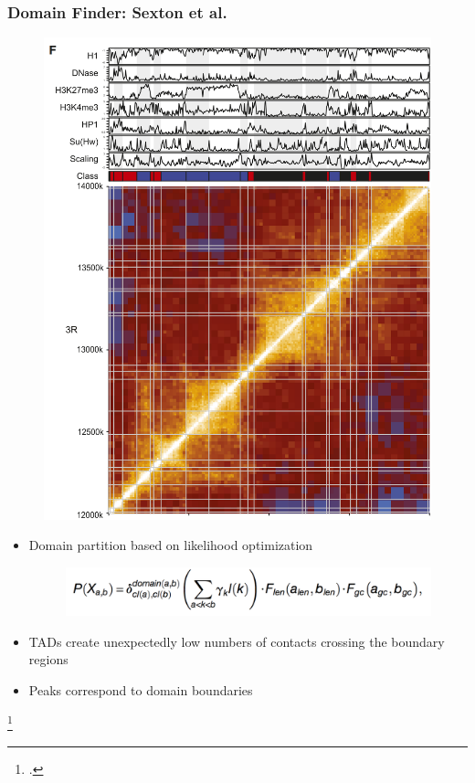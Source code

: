 \documentclass[12pt]{beamer}
\begin{document}
\begin{frame}
\frametitle{Domain Finder: Sexton et al.}

\begin{figure}
\includegraphics[scale=0.27]{dixon.png}
\end{figure}

\begin{itemize}
\item Domain partition based on likelihood optimization
\begin{figure}
\includegraphics[scale=0.8]{dixoneq.png}
\end{figure}
\vspace{0.1cm}
\item TADs create unexpectedly low numbers of contacts crossing the
  boundary regions
\vspace{0.1cm}
\item Peaks correspond to domain boundaries
\end{itemize}

\footcitetext{sexton2012}

\end{frame}
\end{document}
